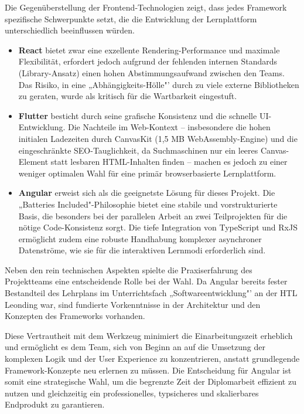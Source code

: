 Die Gegenüberstellung der Frontend-Technologien zeigt, dass jedes Framework spezifische Schwerpunkte setzt, die die Entwicklung der Lernplattform unterschiedlich beeinflussen würden.

\begin{itemize}
\item \textbf{React} bietet zwar eine exzellente Rendering-Performance und maximale Flexibilität, erfordert jedoch aufgrund der fehlenden internen Standards (Library-Ansatz) einen hohen Abstimmungsaufwand zwischen den Teams. Das Risiko, in eine „Abhängigkeits-Hölle"' durch zu viele externe Bibliotheken zu geraten, wurde als kritisch für die Wartbarkeit eingestuft.

\item \textbf{Flutter} besticht durch seine grafische Konsistenz und die schnelle UI-Entwicklung. Die Nachteile im Web-Kontext – insbesondere die hohen initialen Ladezeiten durch CanvasKit (1,5 MB WebAssembly-Engine) und die eingeschränkte SEO-Tauglichkeit, da Suchmaschinen nur ein leeres Canvas-Element statt lesbaren HTML-Inhalten finden – machen es jedoch zu einer weniger optimalen Wahl für eine primär browserbasierte Lernplattform.

\item \textbf{Angular} erweist sich als die geeignetste Lösung für dieses Projekt. Die „Batteries Included"-Philosophie bietet eine stabile und vorstrukturierte Basis, die besonders bei der parallelen Arbeit an zwei Teilprojekten für die nötige Code-Konsistenz sorgt. Die tiefe Integration von TypeScript und RxJS ermöglicht zudem eine robuste Handhabung komplexer asynchroner Datenströme, wie sie für die interaktiven Lernmodi erforderlich sind.
\end{itemize}

Neben den rein technischen Aspekten spielte die Praxiserfahrung des Projektteams eine entscheidende Rolle bei der Wahl. Da Angular bereits fester Bestandteil des Lehrplans im Unterrichtsfach „Softwareentwicklung"' an der HTL Leonding war, sind fundierte Vorkenntnisse in der Architektur und den Konzepten des Frameworks vorhanden.

Diese Vertrautheit mit dem Werkzeug minimiert die Einarbeitungszeit erheblich und ermöglicht es dem Team, sich von Beginn an auf die Umsetzung der komplexen Logik und der User Experience zu konzentrieren, anstatt grundlegende Framework-Konzepte neu erlernen zu müssen. Die Entscheidung für Angular ist somit eine strategische Wahl, um die begrenzte Zeit der Diplomarbeit effizient zu nutzen und gleichzeitig ein professionelles, typsicheres und skalierbares Endprodukt zu garantieren.